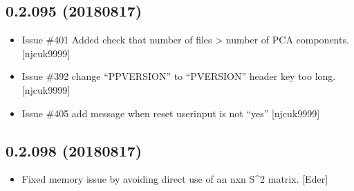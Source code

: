 \documentclass[a4paper,10pt,english]{report}
\begin{document}
\subsection{0.2.095 (2018\sphinxhyphen{}08\sphinxhyphen{}17)}
\label{\detokenize{misc/changelog:id384}}\begin{itemize}
\item {} 
Issue \#401 \sphinxhyphen{} Added check that number of  files \textgreater{} number of
PCA components. {[}njcuk9999{]}

\item {} 
Issue \#392 change “PPVERSION” to “PVERSION” \sphinxhyphen{} header key too long.
{[}njcuk9999{]}

\item {} 
Issue \#405 \sphinxhyphen{} add message when reset userinput is not “yes” {[}njcuk9999{]}

\end{itemize}


\subsection{0.2.098 (2018\sphinxhyphen{}08\sphinxhyphen{}17)}
\label{\detokenize{misc/changelog:id385}}\begin{itemize}
\item {} 
Fixed memory issue by avoiding direct use of an nxn S\textasciicircum{}2 matrix. {[}Eder{]}

\end{itemize}
\end{document}
